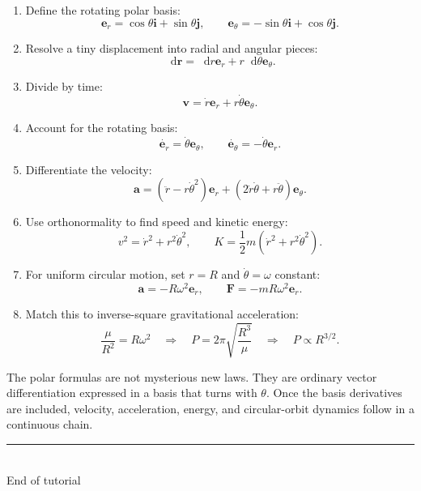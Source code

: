 \documentclass[11pt,a4paper]{article}
\newcommand{\er}{\bm e_r}
\newcommand{\etheta}{\bm e_\theta}
\newcommand{\ii}{\bm i}
\newcommand{\jj}{\bm j}
\newcommand{\rr}{\bm r}
\newcommand{\vv}{\bm v}
\newcommand{\acc}{\bm a}
\newcommand{\FF}{\bm F}
\newcommand{\dd}{\mathop{}\!\mathrm d}
\begin{document}
\begin{enumerate}
  \item Define the rotating polar basis:
  \[
    \er=\cos\theta\ii+\sin\theta\jj,
    \qquad
    \etheta=-\sin\theta\ii+\cos\theta\jj.
  \]

  \item Resolve a tiny displacement into radial and angular pieces:
  \[
    \dd\rr=\dd r\er+r\dd\theta\etheta.
  \]

  \item Divide by time:
  \[
    \vv=\dot r\er+r\dot\theta\etheta.
  \]

  \item Account for the rotating basis:
  \[
    \dot{\er}=\dot\theta\etheta,
    \qquad
    \dot{\etheta}=-\dot\theta\er.
  \]

  \item Differentiate the velocity:
  \[
    \acc=(\ddot r-r\dot\theta^2)\er
    +(2\dot r\dot\theta+r\ddot\theta)\etheta.
  \]

  \item Use orthonormality to find speed and kinetic energy:
  \[
    v^2=\dot r^2+r^2\dot\theta^2,
    \qquad
    K=\frac12m(\dot r^2+r^2\dot\theta^2).
  \]

  \item For uniform circular motion, set $r=R$ and $\dot\theta=\omega$ constant:
  \[
    \acc=-R\omega^2\er,
    \qquad
    \FF=-mR\omega^2\er.
  \]

  \item Match this to inverse-square gravitational acceleration:
  \[
    \frac{\mu}{R^2}=R\omega^2
    \quad\Longrightarrow\quad
    P=2\pi\sqrt{\frac{R^3}{\mu}}
    \quad\Longrightarrow\quad
    P\propto R^{3/2}.
  \]
\end{enumerate}

\begin{result}
The polar formulas are not mysterious new laws. They are ordinary vector differentiation expressed in a basis that turns with $\theta$. Once the basis derivatives are included, velocity, acceleration, energy, and circular-orbit dynamics follow in a continuous chain.
\end{result}

\vfill
\begin{center}
{\color{blue}\rule{0.55\textwidth}{0.8pt}}\\[2mm]
{\small\color{ink!75}End of tutorial}
\end{center}
\end{document}
